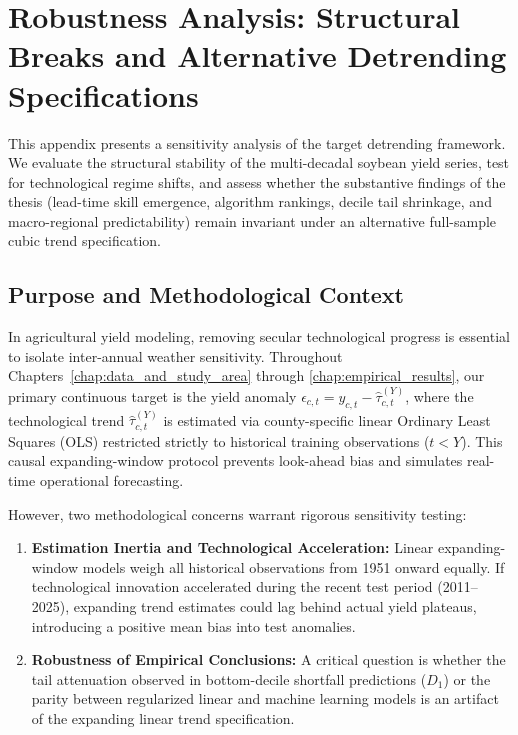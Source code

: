 \chapter{Robustness Analysis: Structural Breaks and Alternative Detrending Specifications}
\label{chap:appendix_detrending}

This appendix presents a sensitivity analysis of the target detrending framework. We evaluate the structural stability of the multi-decadal soybean yield series, test for technological regime shifts, and assess whether the substantive findings of the thesis (lead-time skill emergence, algorithm rankings, decile tail shrinkage, and macro-regional predictability) remain invariant under an alternative full-sample cubic trend specification.


\section{Purpose and Methodological Context}
\label{sec:app_context}

In agricultural yield modeling, removing secular technological progress is essential to isolate inter-annual weather sensitivity. Throughout Chapters~\ref{chap:data_and_study_area} through \ref{chap:empirical_results}, our primary continuous target is the yield anomaly $\epsilon_{c, t} = y_{c, t} - \hat{\tau}_{c, t}^{(Y)}$, where the technological trend $\hat{\tau}_{c, t}^{(Y)}$ is estimated via county-specific linear Ordinary Least Squares (OLS) restricted strictly to historical training observations ($t < Y$). This causal expanding-window protocol prevents look-ahead bias and simulates real-time operational forecasting.

However, two methodological concerns warrant rigorous sensitivity testing:
\begin{enumerate}
    \item \textbf{Estimation Inertia and Technological Acceleration:} Linear expanding-window models weigh all historical observations from 1951 onward equally. If technological innovation accelerated during the recent test period (2011--2025), expanding trend estimates could lag behind actual yield plateaus, introducing a positive mean bias into test anomalies.
    \item \textbf{Robustness of Empirical Conclusions:} A critical question is whether the tail attenuation observed in bottom-decile shortfall predictions ($D_1$) or the parity between regularized linear and machine learning models is an artifact of the expanding linear trend specification.
\end{enumerate}

